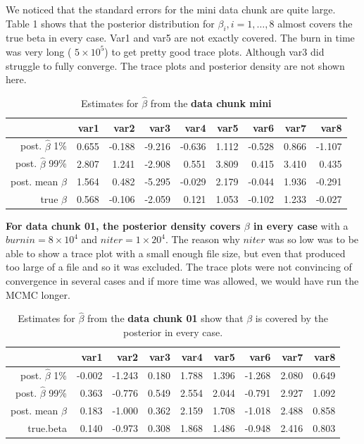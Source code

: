 \documentclass[9pt]{amsart}
\begin{document}
We noticed that the standard errors for the mini data chunk are quite large. Table 1 shows that the posterior distribution for  $\beta_i, i = 1, \dots, 8$ almost covers the true beta in every case. Var1 and var5 are not exactly covered. The burn in time was very long ( $5 \times 10^5$) to get pretty good trace plots. Although var3 did struggle to fully converge. The trace plots and posterior density are not shown here. 
\begin{table}[ht]
\caption{Estimates for $\hat{\beta}$ from the { \bf data chunk mini }}
\centering
\begin{tabular}{rrrrrrrrr}
  \hline
 & var1 & var2 & var3 & var4 & var5 & var6 & var7 & var8 \\ 
  \hline
post.  $\hat{\beta}$ 1\% & 0.655 & -0.188 & -9.216 & -0.636 & 1.112 & -0.528 & 0.866 & -1.107 \\ 
post.  $\hat{\beta}$ 99\% & 2.807 & 1.241 & -2.908 & 0.551 & 3.809 & 0.415 & 3.410 & 0.435 \\ 
  post. mean $\hat{\beta}$ & 1.564 & 0.482 & -5.295 & -0.029 & 2.179 & -0.044 & 1.936 & -0.291 \\ 
  true $\beta$& 0.568 & -0.106 & -2.059 & 0.121 & 1.053 & -0.102 & 1.233 & -0.027 \\ 
   \hline
\end{tabular}
\end{table}

{ \bf For data chunk 01, the posterior density covers $\beta$ in every case } with a $burnin = 8 \times 10^4$ and $niter  =  1 \times 20^4$.  The reason why $niter$ was so low was to be able to show a trace plot with a small enough file size, but even that produced too large of a file and so it was excluded. The trace plots were not convincing of convergence in several cases and if more time was allowed, we would have run the MCMC longer. 

\begin{table}[ht]
\caption{Estimates for $\hat{\beta}$ from the {\bf data chunk 01 } show that $\beta$ is covered by the posterior in every case.}
\centering
\begin{tabular}{rrrrrrrrr}
  \hline
 & var1 & var2 & var3 & var4 & var5 & var6 & var7 & var8 \\ 
  \hline
post.  $\hat{\beta}$ 1\% & -0.002 & -1.243 & 0.180 & 1.788 & 1.396 & -1.268 & 2.080 & 0.649 \\ 
  post.  $\hat{\beta}$ 99\% & 0.363 & -0.776 & 0.549 & 2.554 & 2.044 & -0.791 & 2.927 & 1.092 \\ 
  post.  mean $\hat{\beta}$ & 0.183 & -1.000 & 0.362 & 2.159 & 1.708 & -1.018 & 2.488 & 0.858 \\ 
  true.beta & 0.140 & -0.973 & 0.308 & 1.868 & 1.486 & -0.948 & 2.416 & 0.803 \\ 
   \hline
\end{tabular}
\end{table}
\end{document}
